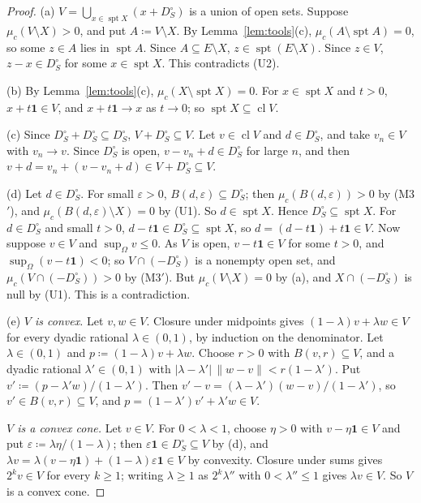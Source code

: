 \documentclass[11pt]{article}
\newcommand{\one}{\mathbf{1}}
\DeclareMathOperator{\cl}{cl}
\DeclareMathOperator{\spt}{spt}
\theoremstyle{plain}
\theoremstyle{definition}
\begin{document}
\begin{proof}
(a) $V=\bigcup_{x\in\spt X}(x+D_S^\circ)$ is a union of open sets. Suppose $\mu_c(V\setminus X)>0$,
and put $A\coloneqq V\setminus X$. By Lemma~\ref{lem:tools}(c), $\mu_c(A\setminus\spt A)=0$, so
some $z\in A$ lies in $\spt A$. Since $A\subseteq E\setminus X$, $z\in\spt(E\setminus X)$.
Since $z\in V$, $z-x\in D_S^\circ$ for some $x\in\spt X$. This contradicts (U2).

(b) By Lemma~\ref{lem:tools}(c), $\mu_c(X\setminus\spt X)=0$. For $x\in\spt X$ and $t>0$,
$x+t\one\in V$, and $x+t\one\to x$ as $t\to0$; so $\spt X\subseteq\cl V$.

(c) Since $D_S^\circ+D_S^\circ\subseteq D_S^\circ$, $V+D_S^\circ\subseteq V$. Let $v\in\cl V$
and $d\in D_S^\circ$, and take $v_n\in V$ with $v_n\to v$. Since $D_S^\circ$ is open,
$v-v_n+d\in D_S^\circ$ for large $n$, and then $v+d=v_n+(v-v_n+d)\in V+D_S^\circ\subseteq V$.

(d) Let $d\in D_S^\circ$. For small $\varepsilon>0$, $B(d,\varepsilon)\subseteq D_S^\circ$; then
$\mu_c(B(d,\varepsilon))>0$ by (M3$'$), and $\mu_c(B(d,\varepsilon)\setminus X)=0$ by (U1). So
$d\in\spt X$. Hence $D_S^\circ\subseteq\spt X$. For $d\in D_S^\circ$ and small $t>0$,
$d-t\one\in D_S^\circ\subseteq\spt X$, so $d=(d-t\one)+t\one\in V$. Now suppose $v\in V$ and
$\sup_\Omega v\le0$. As $V$ is open, $v-t\one\in V$ for some $t>0$, and $\sup_\Omega(v-t\one)
<0$; so $V\cap(-D_S^\circ)$ is a nonempty open set, and $\mu_c(V\cap(-D_S^\circ))>0$ by (M3$'$). But
$\mu_c(V\setminus X)=0$ by (a), and $X\cap(-D_S^\circ)$ is null by (U1). This is a contradiction.

(e) \emph{$V$ is convex.} Let $v,w\in V$. Closure under midpoints gives $(1-\lambda)v+\lambda w
\in V$ for every dyadic rational $\lambda\in(0,1)$, by induction on the denominator. Let
$\lambda\in(0,1)$ and $p\coloneqq(1-\lambda)v+\lambda w$. Choose $r>0$ with $B(v,r)\subseteq
V$, and a dyadic rational $\lambda'\in(0,1)$ with $|\lambda-\lambda'|\,\|w-v\|<r(1-\lambda')$.
Put $v'\coloneqq(p-\lambda'w)/(1-\lambda')$. Then $v'-v=(\lambda-\lambda')(w-v)/(1-\lambda')$,
so $v'\in B(v,r)\subseteq V$, and $p=(1-\lambda')v'+\lambda'w\in V$.

\emph{$V$ is a convex cone.} Let $v\in V$. For $0<\lambda<1$, choose $\eta>0$ with
$v-\eta\one\in V$ and put $\varepsilon\coloneqq\lambda\eta/(1-\lambda)$; then $\varepsilon\one
\in D_S^\circ\subseteq V$ by (d), and $\lambda v=\lambda(v-\eta\one)+(1-\lambda)\varepsilon\one\in V$
by convexity. Closure under sums gives $2^kv\in V$ for every $k\ge1$; writing $\lambda\ge1$ as
$2^k\lambda''$ with $0<\lambda''\le1$ gives $\lambda v\in V$. So $V$ is a convex cone.


\end{proof}
\end{document}
